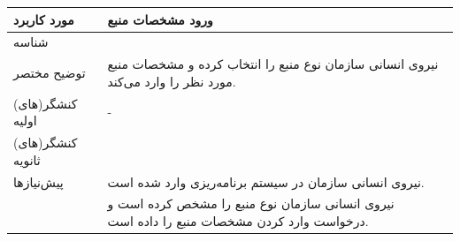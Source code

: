 \begin{table}[H]
	\centering
	\begin{tabular}{|p{3cm}|p{11cm}|}
		\hline
		
		مورد کاربرد & ورود مشخصات منبع  \\
		\hline
		
		شناسه & 
		\stepcounter{usecase_ID}
		
		\arabic{usecase_ID} \\
		
		\hline
		
		توضیح مختصر & نیروی انسانی سازمان نوع منبع را انتخاب کرده و مشخصات منبع مورد نظر را وارد می‌کند. \\
		\hline
		
		کنشگر(های) اولیه& - \\
		\hline
		
		کنشگر(های) ثانویه&  \\
		\hline
		
		پیش‌نیازها &
		نیروی انسانی سازمان در سیستم برنامه‌ریزی وارد شده است.\\
		& نیروی انسانی سازمان نوع منبع را مشخص کرده است و درخواست وارد کردن مشخصات منبع را داده است. \\
		\hline
		

\end{tabular}
\end{table}
